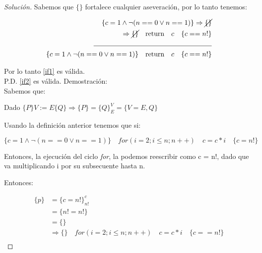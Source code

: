 \begin{proof}[Solución]
  Sabemos que $\{\}$ fortalece cualquier aseveración, por lo tanto
  tenemos:

  \begin{equation*}
    \begin{split}
      \{c = 1 \land \neg (n == 0 \lor n == 1)\} \Rightarrow \cancel{\{\}}\\
      \Rightarrow \cancel{\{\}} \hspace{1em} \text{return}\hspace{1em}
      c\hspace{1em} \{c == n!\}\\
      \rule{6cm}{0.4pt}\\
      \{c = 1 \land \neg (n == 0 \lor n == 1)\}\hspace{1em} \text{return}\hspace{1em}
      c\hspace{1em} \{c == n!\}\\
    \end{split}
  \end{equation*}

  Por lo tanto \ref{if1} es válida.\\

  P.D. \ref{if2} es válida. Demostración:\\

    Sabemos que:

  Dado $\{P\} V:=E \{Q\} \Rightarrow \{P\} = \{Q\}^V_E = \{V=E, Q\}$

  Usando la definición anterior tenemos que si:

  \begin{equation*}
    \{c = 1 \land \neg (n == 0 \lor n == 1)\} \hspace{1em} for(i = 2; i \leq n;
    n++)\hspace{1em} c = c * i \hspace{1em}\{c = n!\}
  \end{equation*}

  Entonces, la ejecución del ciclo \textit{for}, la podemos reescribir
  como c = n!, dado que va multiplicando i por su subsecuente hasta n.

  Entonces:

  \begin{equation*}
    \begin{split}
      \{p\} &= \{c = n!\}^c_{n!}\\
      & = \{n! = n!\}\\
      & = \{\}\\
      & \Rightarrow \{\} \hspace{1em} for(i = 2; i \leq n;
    n++)\hspace{1em} c = c * i \hspace{1em} \{c == n!\}\\
    \end{split}
  \end{equation*}



\end{proof}
